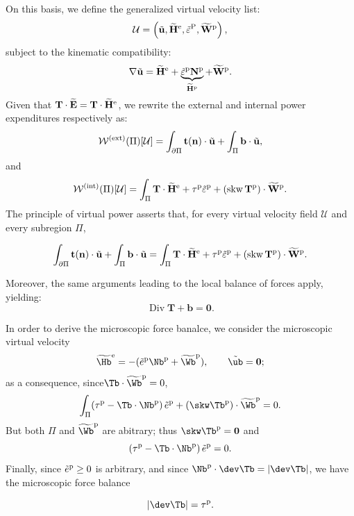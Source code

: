 On this basis, we define the generalized virtual velocity list:
\[
\mathcal{U} = \left( \tilde{\mathbf{u}}, \widetilde{\mathbf{H}}^{\rm e}, \tilde{\varepsilon}^{\rm P}, \widetilde{\mathbf{W}}^{\rm p}\right),
\]
subject to the  kinematic compatibility:
\[
\nabla \tilde{\mathbf{u}} = \widetilde{\mathbf{H}}^{\rm e} + \underbrace{ \tilde{\varepsilon}^{\rm p}\mathbf{N}^{\rm p}}_{\widetilde{\mathbf{H}}^{\rm p}} + \widetilde{\mathbf{W}}^{\rm p}.
\]
Given that \( \mathbf{T} \cdot \widetilde{\mathbf{E}} = \mathbf{T} \cdot\widetilde{\mathbf{H}}^{\rm e} \), we rewrite the external and internal power expenditures respectively as:
\[
\mathcal{W}^{\rm (ext)}(\Pi) [\mathcal{U}]= \int_{\partial \Pi} \mathbf{t}(\mathbf{n}) \cdot \tilde{\mathbf{u}}  + \int_\Pi \mathbf{b} \cdot \tilde{\mathbf{u}},
\]
and
\[
\mathcal{W}^{\rm (int)}(\Pi)[\mathcal{U}] = \int_\Pi  \mathbf{T} \cdot\widetilde{\mathbf{H}}^{\rm e} + \tau^{\rm p}\tilde{\varepsilon}^{\rm p}+ \left( \operatorname{skw} \mathbf{T}^{\rm p}\right) \cdot \widetilde{\mathbf{W}}^{\rm p}.
\]
The principle of virtual power asserts that, for every virtual velocity field \( \mathcal{U} \) and every subregion \( \Pi \),
\begin{definition}
	\[
\int_{\partial \Pi} \mathbf{t}(\mathbf{n}) \cdot \tilde{\mathbf{u}}  + \int_\Pi \mathbf{b} \cdot \tilde{\mathbf{u}}= \int_\Pi  \mathbf{T} \cdot\widetilde{\mathbf{H}}^{\rm e} + \tau^{\rm p}\tilde{\varepsilon}^{\rm p}+ \left( \operatorname{skw} \mathbf{T}^{\rm p}\right) \cdot \widetilde{\mathbf{W}}^{\rm p}.
\]
\end{definition}
Moreover, the same arguments leading to the local balance of forces apply, yielding:
\[
\operatorname{Div} \mathbf{T} + \mathbf{b} = \mathbf{0}.
\]

In order to derive the microscopic force banalce, we consider the microscopic virtual velocity
\begin{equation}
\widetilde{\Hb}^{\rm e}=-(\tilde{e}^{\rm p}\Nb^{\rm p}+\widetilde{\Wb}^{\rm p}), \qquad \tilde{\ub}=\mathbf{0};
\end{equation}
as a consequence, since$\Tb\cdot\widetilde{\Wb}^{\rm p}=0$,
\begin{equation}
\int_\Pi (\tau^{\rm p}-\Tb\cdot\Nb^{\rm p})\,\tilde{e}^{\rm p}+(\skw \Tb^{\rm p})\cdot\widetilde{\Wb}^{\rm p}=0.
\end{equation}
But both $\Pi$ and $\widetilde{\Wb}^{\rm p}$ are abitrary; thus $\skw \Tb^{\rm p}=\mathbf{0}$ and
\begin{equation}
	(\tau^{\rm p}-\Tb\cdot\Nb^{\rm p})\,\tilde{e}^{\rm p}=0.
\end{equation}
Finally, since $\tilde{e}^{\rm p}\geq 0$ is arbitrary, and since $\Nb^{\rm p}\cdot\dev \Tb=|\dev \Tb|$, we have the microscopic force balance
\begin{definition}
	\begin{equation}
|\dev \Tb|=\tau^{\rm p}.
\end{equation}
\end{definition}


